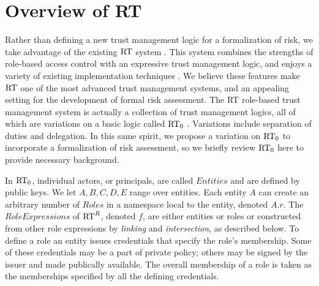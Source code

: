 \section{Overview of RT}
\label{section-rt}

Rather than defining a new trust management logic for a formalization
of risk, we take advantage of the existing $\text{RT}$ system
\cite{Li:2003-04}.  This system combines the strengths of role-based
access control with an expressive trust management logic, and enjoys a
variety of existing implementation techniques \cite{Li:2003-02}.  We
believe these features make $\text{RT}$ one of the most advanced trust
management systems, and an appealing setting for the development of
formal risk assessment.  The RT role-based trust management system is
actually a collection of trust management logics, all of which are
variations on a basic logic called $\text{RT}_0$ \cite{Li:2003-04}.
Variations include separation of duties and delegation.  In this same
spirit, we propose a variation on $\text{RT}_0$ to incorporate a
formalization of risk assessment, so we briefly review $\text{RT}_0$ here to
provide necessary background.

In $\text{RT}_0$, individual actors, or principals, are called
$\mathit{Entities}$ and are defined by public keys.  We let $A,B,C,D,E$
range over entities.  Each entity $A$ can create an arbitrary number
of $\mathit{Roles}$ in a namespace local to the entity,
denoted $A.r$.  The $\mathit{RoleExpressions}$ of $\text{RT}^R$, denoted $f$, are either
entities or roles or constructed from other role expressions by
\emph{linking} and \emph{intersection}, as described below.  To define
a role an entity issues credentials that specify the role's
membership. Some of these credentials may be a part of private policy;
others may be signed by the issuer and made publically available. The
overall membership of a role is taken as the memberships specified by
all the defining credentials.

